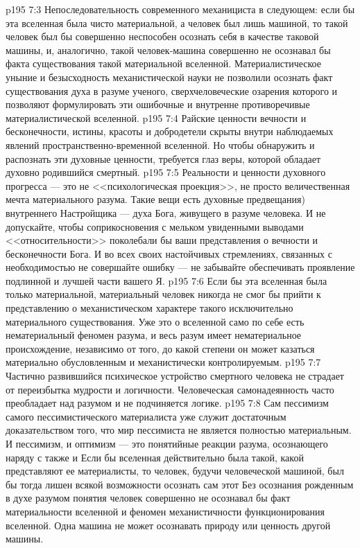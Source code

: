 \vs p195 7:3 Непоследовательность современного механициста в следующем: если бы эта вселенная была чисто материальной, а человек был лишь машиной, то такой человек был бы совершенно неспособен осознать себя в качестве таковой машины, и, аналогично, такой человек\hyp{}машина совершенно не осознавал бы факта существования такой материальной вселенной. Материалистическое уныние и безысходность механистической науки не позволили осознать факт существования духа в разуме ученого, сверхчеловеческие озарения которого и позволяют формулировать эти ошибочные и внутренне противоречивые  материалистической вселенной.
\vs p195 7:4 Райские ценности вечности и бесконечности, истины, красоты и добродетели скрыты внутри наблюдаемых явлений пространственно\hyp{}временной вселенной. Но чтобы обнаружить и распознать эти духовные ценности, требуется глаз веры, которой обладает духовно родившийся смертный.
\vs p195 7:5 Реальности и ценности духовного прогресса --- это не <<психологическая проекция>>, не просто величественная мечта материального разума. Такие вещи есть духовные предвещания) внутреннего Настройщика --- духа Бога, живущего в разуме человека. И не допускайте, чтобы соприкосновения с мельком увиденными выводами <<относительности>> поколебали бы ваши представления о вечности и бесконечности Бога. И во всех своих настойчивых стремлениях, связанных с необходимостью  не совершайте ошибку --- не забывайте обеспечивать  проявление подлинной и лучшей части вашего Я.
\vs p195 7:6 Если бы эта вселенная была только материальной, материальный человек никогда не смог бы прийти к представлению о механистическом характере такого исключительно материального существования. Уже это  о вселенной само по себе есть нематериальный феномен разума, и весь разум имеет нематериальное происхождение, независимо от того, до какой степени он может казаться материально обусловленным и механистически контролируемым.
\vs p195 7:7 Частично развившийся психическое устройство смертного человека не страдает от переизбытка мудрости и логичности. Человеческая самонадеянность часто преобладает над разумом и не подчиняется логике.
\vs p195 7:8 Сам пессимизм самого пессимистического материалиста уже служит достаточным доказательством того, что мир пессимиста не является полностью материальным. И пессимизм, и оптимизм --- это понятийные реакции разума, осознающего наряду с  также и  Если бы вселенная действительно была такой, какой представляют ее материалисты, то человек, будучи человеческой машиной, был бы тогда лишен всякой возможности осознать сам этот  Без осознания рожденным в духе разумом понятия  человек совершенно не осознавал бы факт материальности вселенной и феномен механистичности функционирования вселенной. Одна машина не может осознавать природу или ценность другой машины.
